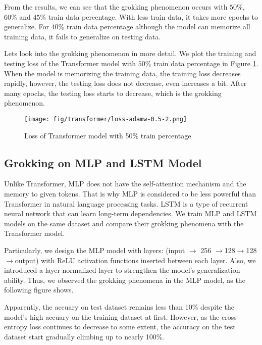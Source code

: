 \documentclass{article}
\begin{document}
    From the results, we can see that the grokking phenomenon occurs with $50\%$, $60\%$ and $45\%$ train data percentage. With less train data, it takes more epochs to generalize. For $40\%$ train data percentage although the model can memorize all training data, it fails to generalize on testing data.

    Lets look into the grokking phenomenon in more detail. We plot the training and testing loss of the Transformer model with $50\%$ train data percentage in Figure \ref{fig:transformer-loss}. When the model is memorizing the training data, the training loss decreases rapidly, however, the testing loss does not decrease, even increases a bit. After many epochs, the testing loss starts to decrease, which is the grokking phenomenon.

    \begin{figure}[ht]
        \centering
        \texttt{[image: fig/transformer/loss-adamw-0.5-2.png]}
        \caption{Loss of Transformer model with 50\% train percentage}
        \label{fig:transformer-loss}
    \end{figure}

    \subsection{Grokking on MLP and LSTM Model}

    Unlike Transformer, MLP does not have the self-attention mechanism and the memory to given tokens. That is why MLP is considered to be less powerful than Transformer in natural language processing tasks. LSTM is a type of recurrent neural network that can learn long-term dependencies. We train MLP and LSTM models on the same dataset and compare their grokking phenomena with the Transformer model.

    Particularly, we design the MLP model with layers: (input $\rightarrow$ 256 $\rightarrow $128$ \rightarrow $128$ \rightarrow $output) with ReLU activation functions inserted between each layer. Also, we introduced a layer normalized layer to strengthen the model's generalization ability. Thus, we observed the grokking phenomena in the MLP model, as the following figure shows.
    


    Apparently, the accuary on test dataset remains less than 10\% despite the model's high accuary on the training dataset at first. However, as the cross entropy loss continues to decrease to some extent, the accuracy on the test dataset start gradually climbing up to nearly 100\%.
\end{document}
